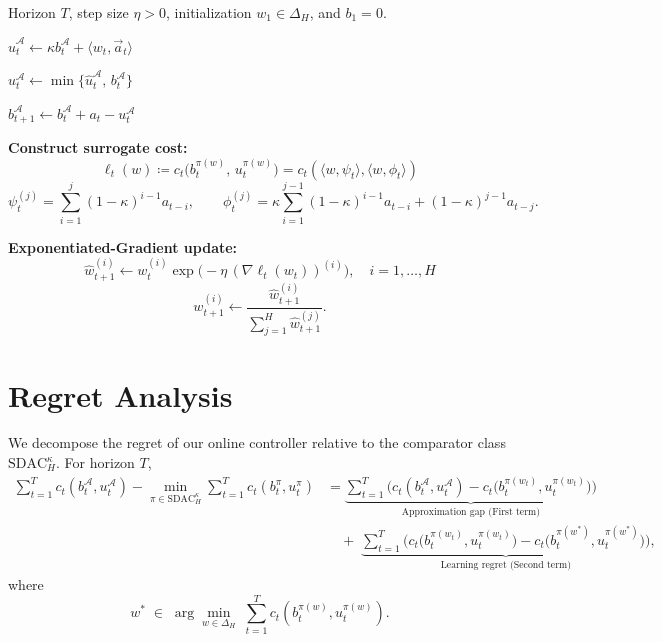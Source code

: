 \documentclass[11pt]{article}
\begin{document}
\begin{algorithm}
\caption{Exponentiated-Gradient Perturbation Controller (EGPC)}
\label{alg:egpc}
\begin{algorithmic}[1]
\Require Horizon \(T\), step size \(\eta > 0\), initialization \(w_1 \in \Delta_H\), and \(b_1 = 0\).

    \State \(
        \widehat{u}_t^\mathcal{A} \gets \kappa b_t^\mathcal{A} + \langle w_t, \vec{a}_t\rangle
    \)

    \State \(u_t^\mathcal{A} \gets \min\{\widehat{u}_t^\mathcal{A},\, b_t^\mathcal{A}\}\)
        
    

    \State \(
        b_{t+1}^\mathcal{A} \gets b_t^\mathcal{A} + a_t - u_t^\mathcal{A}
    \)

    \State \textbf{Construct surrogate cost:}
    \[
        \ell_t(w) \coloneqq c_t\!\big(b_t^{\pi(w)},\,u_t^{\pi(w)}\big)
        = c_t\!\left(\langle w , \psi_t\rangle , \langle w , \phi_t\rangle\right)
    \]
    \[
        \psi_t^{(j)} = \sum_{i=1}^{j} (1-\kappa)^{i-1} a_{t-i}, 
        \qquad
        \phi_t^{(j)} = \kappa \sum_{i=1}^{j-1} (1-\kappa)^{i-1} a_{t-i}
        + (1-\kappa)^{j-1} a_{t-j}.
    \]

    \State \textbf{Exponentiated-Gradient update:}
    \[
        \widehat{w}_{t+1}^{(i)} \gets w_t^{(i)} \exp\!\big(-\eta \,(\nabla \ell_t(w_t))^{(i)}\big),
        \quad i = 1,\dots,H
    \]
    \[
        w_{t+1}^{(i)} \gets
        \frac{\widehat{w}_{t+1}^{(i)}}{\sum_{j=1}^H \widehat{w}_{t+1}^{(j)}}.
    \]
\EndFor
\end{algorithmic}
\end{algorithm}

\section{Regret Analysis}

We decompose the regret of our online controller relative to the comparator class \(\mathrm{SDAC}_H^\kappa\).  
For horizon \(T\),
\begin{align*}
\sum_{t=1}^T c_t(b_t^\mathcal{A},u_t^\mathcal{A})
- \min_{\pi\in\mathrm{SDAC}_H^\kappa} \sum_{t=1}^T c_t(b_t^\pi,u_t^\pi)
&=
\underbrace{\sum_{t=1}^T \Big( c_t(b_t^\mathcal{A},u_t^\mathcal{A}) - c_t\big(b_t^{\pi(w_t)},u_t^{\pi(w_t)}\big)\Big)}_{\text{Approximation gap (First term)}} \\
&\quad+\;
\underbrace{\sum_{t=1}^T \Big( c_t\big(b_t^{\pi(w_t)},u_t^{\pi(w_t)}\big) - c_t\big(b_t^{\pi(w^*)}, u_t^{\pi(w^*)}\big)\Big)}_{\text{Learning regret (Second term)}},
\end{align*}
where
\[
w^* \;\in\; \arg\min_{w\in\Delta_H}\; \sum_{t=1}^T c_t\!\left(b_t^{\pi(w)},u_t^{\pi(w)}\right).
\]
\end{document}
